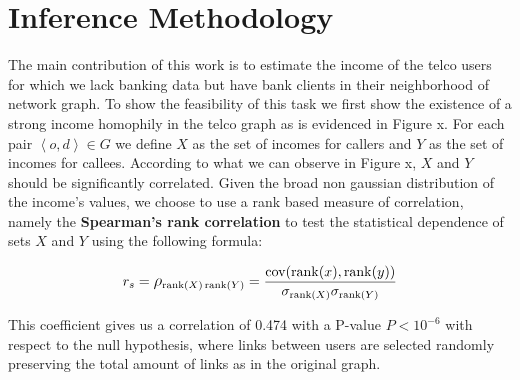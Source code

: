 \section{Inference Methodology}






The main contribution of this work is to estimate the income of the telco users for which we lack banking data but have bank clients in their neighborhood of network graph. To show the feasibility of this task we first show the existence of a strong income homophily in the telco graph as is evidenced in Figure x. For each pair \( \left< o, d \right> \in G \) we define \( X \) as the set of incomes for callers and \( Y \) as the set of incomes for callees. According to what we can observe in Figure x, \( X \) and \( Y \) should be significantly correlated. Given the broad non gaussian distribution of the income's values, we choose to use a rank based measure of correlation, namely the \textbf{Spearman's rank correlation} to test the statistical dependence of sets \( X \) and \( Y \) using the following formula: 

\[
r_s = \mathlarger{\rho}_{\operatorname{rank}(X) \operatorname{rank}(Y)} = \frac{\operatorname{cov}(\operatorname{rank}(x), \operatorname{rank}(y))}{\sigma_{\operatorname{rank}(X)} \sigma_{\operatorname{rank}(Y)}}
\]

This coefficient gives us a correlation of \num{0.474} with a P-value $ P < 10^{-6} $  with respect to the null hypothesis, where links between users are selected randomly preserving the total amount of links as in the original graph.

